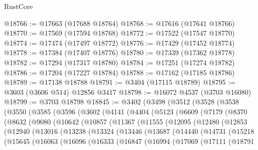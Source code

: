\begin{lexlean}{RustCore}
\begin{coremodule}
@18766 := @17663 (@17688 @18764)
@18768 := @17616 (@17641 @18766)
@18770 := @17569 (@17594 @18768)
@18772 := @17522 (@17547 @18770)
@18774 := @17474 (@17497 @18772)
@18776 := @17429 (@17452 @18774)
@18778 := @17384 (@17407 @18776)
@18780 := @17339 (@17362 @18778)
@18782 := @17294 (@17317 @18780)
@18784 := @17251 (@17274 @18782)
@18786 := @17204 (@17227 @18784)
@18788 := @17162 (@17185 @18786)
@18789 := @17138 @18788
@18791 := @3404 (@17115 @18789)
@18795 := @3603 (@3606 @514) @12856 @3417
@18798 := @16072 @4537 (@3703 @16080)
@18799 := @3703 @18798
@18845 := @3402
    (@3498
      (@3512
        (@3528
          (@3538
            (@3550
              (@3585
                (@3596
                  (@3602
                    (@4141
                      (@4404
                        (@5123
                          (@6609
                            (@7179
                              (@8370
                                (@8632
                                  (@9080
                                    (@10642
                                      (@10857
                                        (@11367
                                          (@11555
                                            (@12095
                                              (@12480
                                                (@12853
                                                  (@12940
                                                    (@13016
                                                      (@13238
                                                        (@13324
                                                          (@13446
                                                            (@13687
                                                              (@14440
                                                                (@14731
                                                                  (@15218
                                                                    (@15645
                                                                      (@16063
                                                                        (@16096
                                                                          (@16333
                                                                            (@16847
                                                                              (@16994
                                                                                (@17069
                                                                                  (@17111
                                                                                    (@18791

\end{coremodule}
\end{lexlean}
